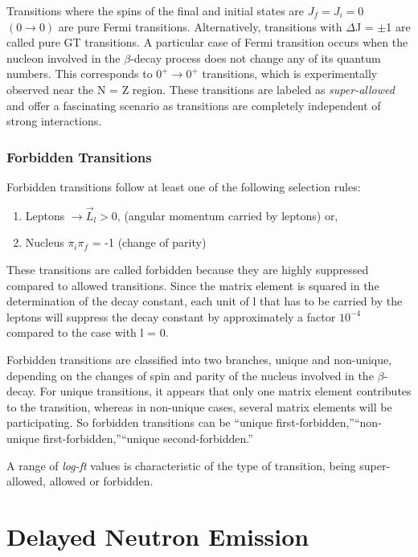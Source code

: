 Transitions where the spins of the final and initial states are $J_{f} = J_{i} = 0$  $(0 \to 0)$ are pure Fermi transitions. Alternatively, transitions with $\Delta$J = $\pm$1 are called pure GT transitions. A particular case of Fermi transition occurs when the nucleon involved in the $\beta$-decay process does not change any of its quantum numbers. This corresponds to $0^{+} \to  0^{+}$ transitions, which is experimentally observed near the N = Z region. These transitions are labeled as \textit{super-allowed} and offer a fascinating scenario as transitions are completely independent of strong interactions. 

\subsubsection{Forbidden Transitions}
Forbidden transitions follow at least one of the following selection rules:
\begin{enumerate}
	\item Leptons $\to \vec{L}_{l} > 0$, (angular momentum carried by leptons) or,
	\item Nucleus $\pi_{i}\pi_{f}$ = -1 (change of parity)
\end{enumerate}

These transitions are called forbidden because they are highly suppressed compared to allowed transitions. Since the matrix element is squared in the determination of the decay constant, each unit of l that has to be carried by the leptons will suppress the decay constant by approximately a factor $10^{-4}$ compared to the case with l = 0.

Forbidden transitions are classified into two branches, unique and non-unique, depending on the changes of spin and parity of the nucleus involved in the $\beta$-decay. For unique transitions, it appears that only one matrix element contributes to the transition, whereas in non-unique cases, several matrix elements will be participating. So forbidden transitions can be \textquotedblleft unique first-forbidden,\textquotedblright \textquotedblleft non-unique first-forbidden,\textquotedblright \textquotedblleft unique second-forbidden.\textquotedblright

A range of \textit{log-ft} values is characteristic of the type of transition, being super-allowed, allowed or forbidden.


\section{Delayed Neutron Emission}

